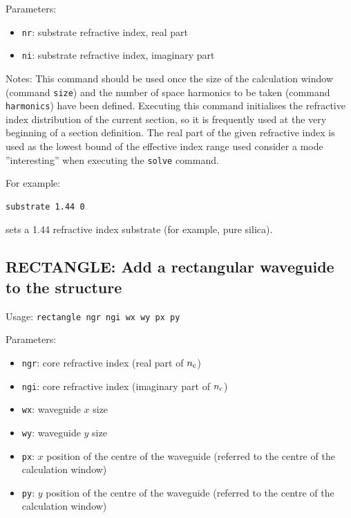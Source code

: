 Parameters:
\begin{itemize}
\item \lstinline!nr!: substrate refractive index, real part
\item \lstinline!ni!: substrate refractive index, imaginary part
\end{itemize}
Notes:
    This command should be used once the size of the calculation window (command \lstinline!size!) and 
    the number of space harmonics to be taken (command \lstinline!harmonics!) have been defined.
    Executing this command initialises the refractive index distribution of the current section, so it is frequently used at the very beginning of a section definition.
    The real part of the given refractive index is used as the lowest bound of
    the effective index range used consider a mode ''interesting'' when executing the \lstinline!solve! command.

For example:
\begin{lstlisting}
substrate 1.44 0
\end{lstlisting}
sets a 1.44 refractive index substrate (for example, pure silica).


\subsection{RECTANGLE: Add a rectangular waveguide to the structure}
\label{subsec_rectangle}
Usage: \lstinline!rectangle ngr ngi wx wy px py!
    
Parameters:
\begin{itemize}
\item \lstinline!ngr!: core refractive index (real part of $n_\mathrm{c}$)
\item \lstinline!ngi!: core refractive index (imaginary part of $n_\mathrm{c}$)
\item \lstinline!wx!: waveguide $x$ size
\item \lstinline!wy!: waveguide $y$ size
\item \lstinline!px!: $x$ position of the centre of the waveguide (referred to the centre of the calculation window)
\item \lstinline!py!: $y$ position of the centre of the waveguide (referred to the centre of the  calculation window)
\end{itemize}

